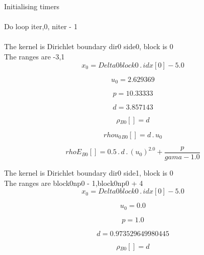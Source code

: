 \documentclass{article}
\begin{document}
\noindent Initialising timers\\
\\\noindent Do loop iter,0, niter - 1\\
\\\noindent The kernel is Dirichlet boundary dir0 side0, block is 0\\\noindent The ranges are -3,1\\\begin{dmath}x_{0} = Delta0block0 \,.\, {idx}[{0}] - 5.0\end{dmath}

\begin{dmath}u_{0} = 2.629369\end{dmath}

\begin{dmath}p = 10.33333\end{dmath}

\begin{dmath}d = 3.857143\end{dmath}

\begin{dmath}{\rho{_{B0}}}[{}] = d\end{dmath}

\begin{dmath}{rhou_{0}{_{B0}}}[{}] = d \,.\, u_{0}\end{dmath}

\begin{dmath}{rhoE{_{B0}}}[{}] = 0.5 \,.\, d \,.\, \left(u_{0} \right)^{2.0} + \frac{p}{gama - 1.0}\end{dmath}

\noindent The kernel is Dirichlet boundary dir0 side1, block is 0\\\noindent The ranges are block0np0 - 1,block0np0 + 4\\\begin{dmath}x_{0} = Delta0block0 \,.\, {idx}[{0}] - 5.0\end{dmath}

\begin{dmath}u_{0} = 0.0\end{dmath}

\begin{dmath}p = 1.0\end{dmath}

\begin{dmath}d = 0.973529649980445\end{dmath}

\begin{dmath}{\rho{_{B0}}}[{}] = d\end{dmath}
\end{document}
